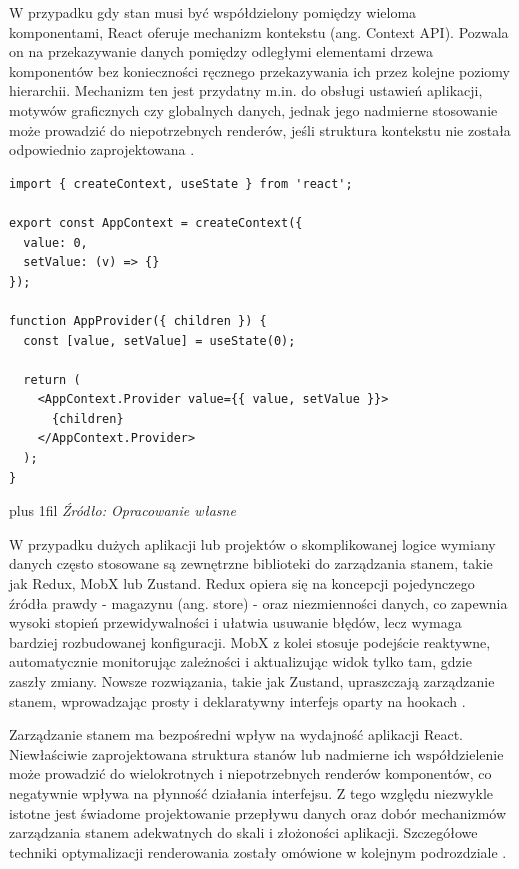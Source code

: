 \documentclass[12pt,openright,twoside]{report}
\newcommand{\source}[1]{{\par\vspace{5pt}\noindent\leftskip=0pt \rightskip=0pt \parfillskip=0pt plus 1fil \footnotesize\textit{Źródło: #1}\par}}
\begin{document}
W przypadku gdy stan musi być współdzielony pomiędzy wieloma komponentami, React oferuje mechanizm kontekstu (ang. Context API). Pozwala on na przekazywanie danych pomiędzy odległymi elementami drzewa komponentów bez konieczności ręcznego przekazywania ich przez kolejne poziomy hierarchii. Mechanizm ten jest przydatny m.in. do obsługi ustawień aplikacji, motywów graficznych czy globalnych danych, jednak jego nadmierne stosowanie może prowadzić do niepotrzebnych renderów, jeśli struktura kontekstu nie została odpowiednio zaprojektowana \cite{React_Official}.

\begin{lstlisting}[language=tsx, caption={Podstawowy przykład użycia Context API do współdzielenia stanu.}, label={lst:react-context}]
import { createContext, useState } from 'react';

export const AppContext = createContext({
  value: 0,
  setValue: (v) => {}
});

function AppProvider({ children }) {
  const [value, setValue] = useState(0);

  return (
    <AppContext.Provider value={{ value, setValue }}>
      {children}
    </AppContext.Provider>
  );
}
\end{lstlisting}
\source{Opracowanie własne}

W przypadku dużych aplikacji lub projektów o skomplikowanej logice wymiany danych często stosowane są zewnętrzne biblioteki do zarządzania stanem, takie jak Redux, MobX lub Zustand. Redux opiera się na koncepcji pojedynczego źródła prawdy - magazynu (ang. store) - oraz niezmienności danych, co zapewnia wysoki stopień przewidywalności i ułatwia usuwanie błędów, lecz wymaga bardziej rozbudowanej konfiguracji. MobX z kolei stosuje podejście reaktywne, automatycznie monitorując zależności i aktualizując widok tylko tam, gdzie zaszły zmiany. Nowsze rozwiązania, takie jak Zustand, upraszczają zarządzanie stanem, wprowadzając prosty i deklaratywny interfejs oparty na hookach \cite{Design_Patterns_JS}.

Zarządzanie stanem ma bezpośredni wpływ na wydajność aplikacji React. Niewłaściwie zaprojektowana struktura stanów lub nadmierne ich współdzielenie może prowadzić do wielokrotnych i niepotrzebnych renderów komponentów, co negatywnie wpływa na płynność działania interfejsu. Z tego względu niezwykle istotne jest świadome projektowanie przepływu danych oraz dobór mechanizmów zarządzania stanem adekwatnych do skali i złożoności aplikacji. Szczegółowe techniki optymalizacji renderowania zostały omówione w kolejnym podrozdziale \cite{High_Perf_JS}.
\end{document}

